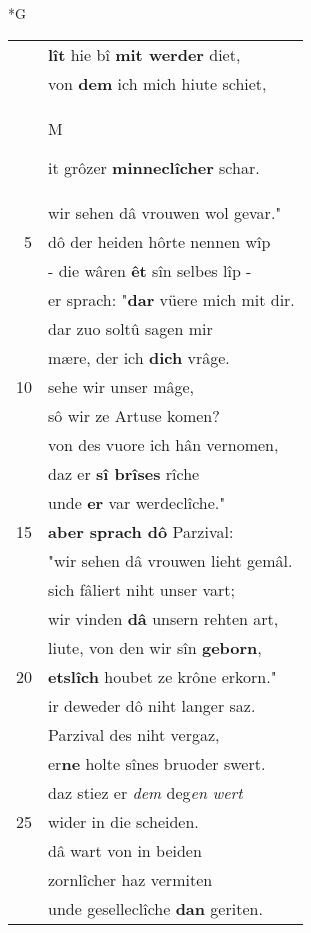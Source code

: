 \documentclass[8pt,a4paper,notitlepage]{article}
\begin{document}
\newpage
\begin{table}[ht]
\begin{minipage}[t]{0.5\linewidth}
\small
\begin{center}*G
\end{center}
\begin{tabular}{rl}
 & \textbf{lît} hie bî \textbf{mit werder} diet,\\ 
 & von \textbf{dem} ich mich hiute schiet,\\ 
 & \begin{large}M\end{large}it grôzer \textbf{minneclîcher} schar.\\ 
 & wir sehen dâ vrouwen wol gevar."\\ 
5 & dô der heiden hôrte nennen wîp\\ 
 & - die wâren \textbf{êt} sîn selbes lîp -\\ 
 & er sprach: "\textbf{dar} vüere mich mit dir.\\ 
 & dar zuo soltû sagen mir\\ 
 & mære, der ich \textbf{dich} vrâge.\\ 
10 & sehe wir unser mâge,\\ 
 & sô wir ze Artuse komen?\\ 
 & von des vuore ich hân vernomen,\\ 
 & daz er \textbf{sî brîses} rîche\\ 
 & unde \textbf{er} var werdeclîche."\\ 
15 & \textbf{aber sprach dô} Parzival:\\ 
 & "wir sehen dâ vrouwen lieht gemâl.\\ 
 & sich fâliert niht unser vart;\\ 
 & wir vinden \textbf{dâ} unsern rehten art,\\ 
 & liute, von den wir sîn \textbf{geborn},\\ 
20 & \textbf{etslîch} houbet ze krône erkorn."\\ 
 & ir deweder dô niht langer saz.\\ 
 & Parzival des niht vergaz,\\ 
 & er\textbf{ne} holte sînes bruoder swert.\\ 
 & daz stiez er \textit{dem} deg\textit{en wert}\\ 
25 & wider in die scheiden.\\ 
 & dâ wart von in beiden\\ 
 & zornlîcher haz vermiten\\ 
 & unde geselleclîche \textbf{dan} geriten.\\ 

\end{tabular}
\end{minipage}
\end{table}
\end{document}
